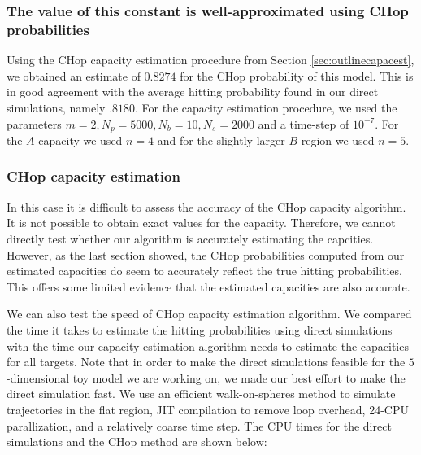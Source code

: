 \documentclass[english, aip, jcp, priprint, graphicx,floatfix]{revtex4-1}
\theoremstyle{plain}
\theoremstyle{definition}
\theoremstyle{plain}
\begin{document}
\subsubsection{The value of this constant is well-approximated using CHop probabilities}

Using the CHop capacity estimation procedure from Section \ref{sec:outlinecapacest}, we obtained an estimate of $0.8274$ for the CHop probability of this model.  This is in good agreement with the average hitting probability found in our direct simulations, namely $.8180$.  For the capacity estimation procedure, we used the parameters $m=2,N_p=5000,N_b=10,N_s=2000$ and a time-step of $10^{-7}$.  For the $A$ capacity we used $n=4$ and for the slightly larger $B$ region we used $n=5$.  

\subsubsection{CHop capacity estimation}

In this case it is difficult to assess the accuracy of the CHop capacity algorithm.  It is not possible to obtain exact values for the capacity.  Therefore, we cannot directly test whether our algorithm is accurately estimating the capcities.  However, as the last section showed, the CHop probabilities computed from our estimated capacities do seem to accurately reflect the true hitting probabilities.  This offers some limited evidence that the estimated capacities are also accurate.

We can also test the speed of CHop capacity estimation algorithm.  We compared the time it takes to estimate the hitting probabilities using direct simulations with the time our capacity estimation algorithm needs to estimate the capacities for all targets. Note that in order to make the direct simulations feasible for the $5$-dimensional toy model we are working on, we made our best effort to make the direct simulation fast.  We use an efficient walk-on-spheres method to simulate trajectories in the flat region,\cite{bingham1972random} JIT compilation to remove loop overhead, 24-CPU parallization, and a relatively coarse time step.  The CPU times for the direct simulations and the CHop method are shown below:
\end{document}
